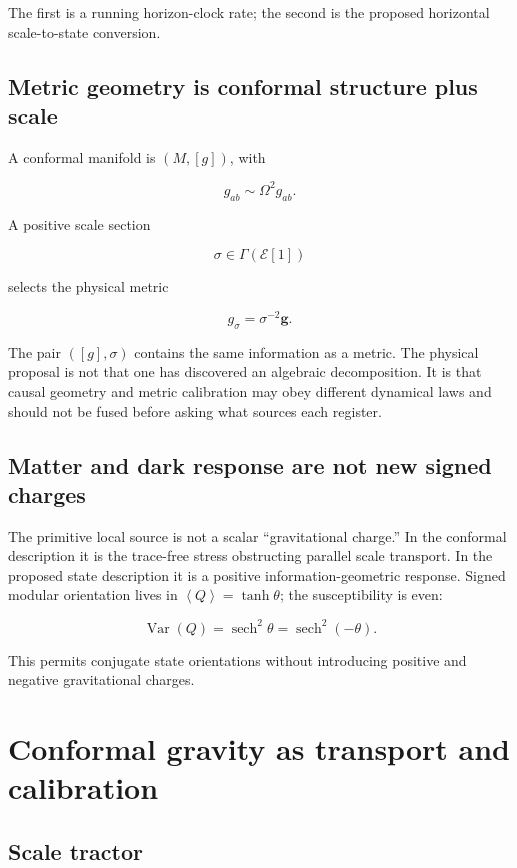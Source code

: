\documentclass[
  11pt,
  letterpaper,
]{article}
\begin{document}
The first is a running horizon-clock rate; the second is the proposed
horizontal scale-to-state conversion.

\subsection{Metric geometry is conformal structure plus
scale}\label{metric-geometry-is-conformal-structure-plus-scale}

A conformal manifold is \((M,[g])\), with

\[
g_{ab}\sim\Omega^2g_{ab}.
\]

A positive scale section

\[
\sigma\in\Gamma(\mathcal E[1])
\]

selects the physical metric

\[
g_\sigma=\sigma^{-2}\boldsymbol g.
\]

The pair \(([g],\sigma)\) contains the same information as a metric. The
physical proposal is not that one has discovered an algebraic
decomposition. It is that causal geometry and metric calibration may
obey different dynamical laws and should not be fused before asking what
sources each register.

\subsection{Matter and dark response are not new signed
charges}\label{matter-and-dark-response-are-not-new-signed-charges}

The primitive local source is not a scalar ``gravitational charge.'' In
the conformal description it is the trace-free stress obstructing
parallel scale transport. In the proposed state description it is a
positive information-geometric response. Signed modular orientation
lives in \(\left\langle Q\right\rangle=\tanh\theta\); the susceptibility
is even:

\[
\operatorname{Var}(Q)=\operatorname{sech}^2\theta=\operatorname{sech}^2(-\theta).
\]

This permits conjugate state orientations without introducing positive
and negative gravitational charges.

\section{Conformal gravity as transport and
calibration}\label{conformal-gravity-as-transport-and-calibration}

\subsection{Scale tractor}\label{scale-tractor}
\end{document}
